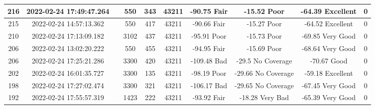 \begin{longtable*}{|c|c|c|c|c|c|c|c|c|c|}
216&2022-02-24 17:49:47.264&&550&343&43211& -90.75    Fair        & -15.52    Poor        & -64.39    Excellent   & 0\\\hline
{}215&2022-02-24 14:57:13.362&&550&417&43211& -90.66    Fair        & -15.27    Poor        & -64.52    Excellent   & 0\\\hline
{}210&2022-02-24 17:13:09.182&&3102&437&43211& -95.91    Poor        & -15.73    Poor        & -69.85    Very Good   & 0\\\hline
{}206&2022-02-24 13:02:20.222&&550&455&43211& -94.95    Fair        & -15.69    Poor        & -68.64    Very Good   & 0\\\hline
{}206&2022-02-24 17:25:21.286&&3300&420&43211& -109.48   Bad         & -29.5     No Coverage & -70.67    Good        & 0\\\hline
{}202&2022-02-24 16:01:35.727&&3300&135&43211& -98.19    Poor        & -29.66    No Coverage & -59.18    Excellent   & 0\\\hline
{}198&2022-02-24 17:27:02.474&&3300&321&43211& -106.17   Bad         & -29.65    No Coverage & -67.45    Very Good   & 0\\\hline
{}192&2022-02-24 17:55:57.319&&1423&222&43211& -93.92    Fair        & -18.28    Very Bad    & -65.39    Very Good   & 0\\\hline

\end{longtable*}
